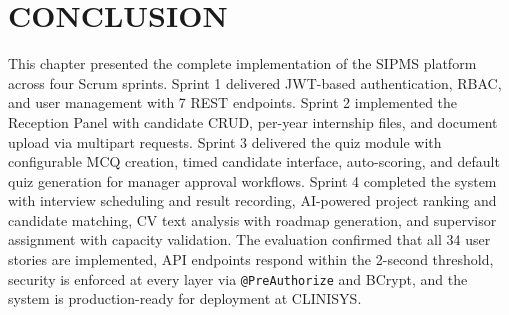 \section{CONCLUSION}
This chapter presented the complete implementation of the SIPMS platform across four Scrum sprints. Sprint 1 delivered JWT-based authentication, RBAC, and user management with 7 REST endpoints. Sprint 2 implemented the Reception Panel with candidate CRUD, per-year internship files, and document upload via multipart requests. Sprint 3 delivered the quiz module with configurable MCQ creation, timed candidate interface, auto-scoring, and default quiz generation for manager approval workflows. Sprint 4 completed the system with interview scheduling and result recording, AI-powered project ranking and candidate matching, CV text analysis with roadmap generation, and supervisor assignment with capacity validation. The evaluation confirmed that all 34 user stories are implemented, API endpoints respond within the 2-second threshold, security is enforced at every layer via \texttt{@PreAuthorize} and BCrypt, and the system is production-ready for deployment at CLINISYS.
